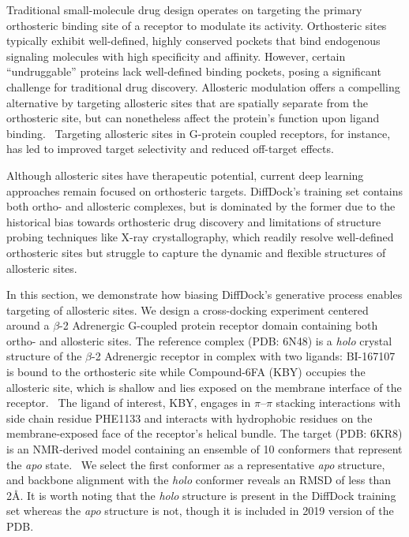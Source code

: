 Traditional small-molecule drug design operates on targeting the primary orthosteric binding site of a receptor to modulate its activity. Orthosteric sites typically exhibit well-defined, highly conserved pockets that bind endogenous signaling molecules with high specificity and affinity. \cite{nussinov2012different} However, certain ``undruggable'' proteins lack well-defined binding pockets, posing a significant challenge for traditional drug discovery. Allosteric modulation offers a compelling alternative by targeting allosteric sites that are spatially separate from the orthosteric site, but can nonetheless affect the protein's function upon ligand binding.~\cite{Xie2023recent} Targeting allosteric sites in G-protein coupled receptors, for instance, has led to improved target selectivity and reduced off-target effects. \cite{nussinov2023alphafold}

Although allosteric sites have therapeutic potential, current deep learning approaches remain focused on orthosteric targets. DiffDock's training set contains both ortho- and allosteric complexes, but is dominated by the former due to the historical bias towards orthosteric drug discovery and limitations of structure probing techniques like X-ray crystallography, which readily resolve well-defined orthosteric sites but struggle to capture the dynamic and flexible structures of allosteric sites.~\cite{nussinov2023alphafold} 

In this section, we demonstrate how biasing DiffDock's generative process enables targeting of allosteric sites. We design a cross-docking experiment centered around a $\beta$-2 Adrenergic G-coupled protein receptor domain containing both ortho- and allosteric sites. The reference complex (PDB: 6N48) is a \textit{holo} crystal structure of the $\beta$-2 Adrenergic receptor in complex with two ligands: BI-167107 is bound to the orthosteric site while Compound-6FA (KBY) occupies the allosteric site, which is shallow and lies exposed on the membrane interface of the receptor.~\cite{liu2019mechanism} The ligand of interest, KBY, engages in $\pi$–$\pi$ stacking interactions with side chain residue PHE1133 and interacts with hydrophobic residues on the membrane-exposed face of the receptor’s helical bundle. The target (PDB: 6KR8) is an NMR-derived model containing an ensemble of 10 conformers that represent the \textit{apo} state.~\cite{imai2020structural} We select the first conformer as a representative \textit{apo} structure, and  backbone alignment with the \textit{holo} conformer reveals an RMSD of less than 2{\AA}. It is worth noting that the \textit{holo} structure is present in the DiffDock training set whereas the \textit{apo} structure is not, though it is included in 2019 version of the PDB.

